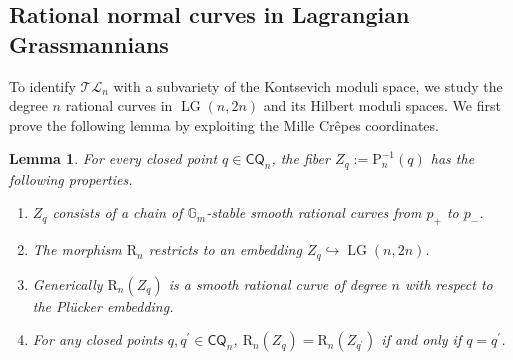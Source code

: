 \documentclass[10pt]{amsart}
\newtheorem{lemma}[theorem]{Lemma}
\theoremstyle{definition}
\newcommand{\LG}{\operatorname{LG}}
\newcommand{\CQ}{\mathsf{CQ}}
\newcommand{\TL}{\mathcal{TL}}
\newcommand{\RL}{\mathrm{R}}
\newcommand{\PL}{\mathrm{P}}
\theoremstyle{plain} %
\begin{document}
\subsection*{Rational normal curves in Lagrangian Grassmannians}
To identify $\TL_n$ with a subvariety of the Kontsevich moduli space, we study the degree $n$ rational curves in $\LG(n,2n)$ and its Hilbert moduli spaces. We first prove the following lemma by exploiting the Mille Cr\^epes coordinates.
\begin{lemma}\label{moduli1l}
For every closed point $q\in\CQ_n$, the fiber $Z_q := \PL_n^{-1}(q)$ has the following properties.
 
\begin{enumerate}[label=(\alph*)]

\item $Z_q$ consists of a chain of $\mathbb G_m$-stable smooth rational curves from $p_+$ to $p_-$.


\item The morphism $\RL_n$ restricts to an embedding $Z_q\hookrightarrow \LG(n,2n)$.

\item Generically $\RL_{n}(Z_q)$ is a smooth rational curve of degree $n$ with respect to the Pl\"ucker embedding.


 
\item For any closed points $q,q^{\prime}\in \CQ_{n}$,  $\RL_{n}(Z_q)=\RL_{n}(Z_{q^{\prime}})$ if and only if $q=q^{\prime}$.
  

     
 
\end{enumerate} 
\end{lemma}
\end{document}

